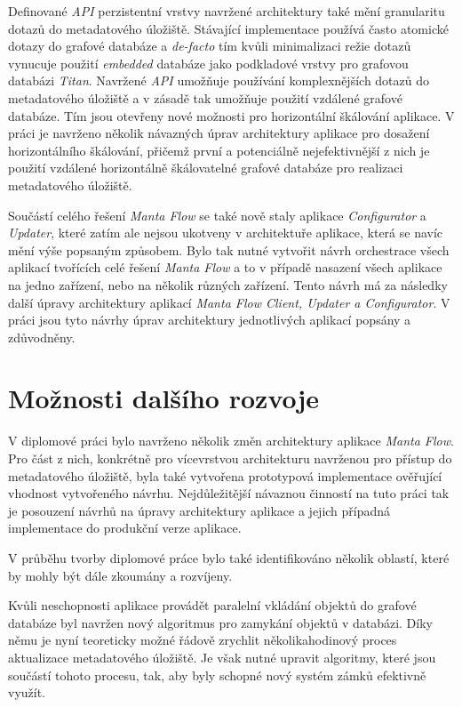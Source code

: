 Definované \textit{API} perzistentní vrstvy navržené architektury také mění granularitu dotazů do metadatového úložiště. Stávající implementace používá často atomické dotazy do grafové databáze a \textit{de-facto} tím kvůli minimalizaci režie dotazů vynucuje použití \textit{embedded} databáze jako podkladové vrstvy pro grafovou databázi \textit{Titan}. Navržené \textit{API} umožňuje používání komplexnějších dotazů do metadatového úložiště a v zásadě tak umožňuje použití vzdálené grafové databáze. Tím jsou otevřeny nové možnosti pro horizontální škálování aplikace. V práci je navrženo několik návazných úprav architektury aplikace pro dosažení horizontálního škálování, přičemž první a potenciálně nejefektivnější z nich je použití vzdálené horizontálně škálovatelné grafové databáze pro realizaci metadatového úložiště.

Součástí celého řešení \textit{Manta Flow} se také nově staly aplikace \textit{Configurator} a \textit{Updater}, které zatím ale nejsou ukotveny v architektuře aplikace, která se navíc mění výše popsaným způsobem. Bylo tak nutné vytvořit návrh orchestrace všech aplikací tvořících celé řešení \textit{Manta Flow} a to v případě nasazení všech aplikace na jedno zařízení, nebo na několik různých zařízení. Tento návrh má za následky další úpravy architektury aplikací \textit{Manta Flow Client, Updater a Configurator}. V práci jsou tyto návrhy úprav architektury jednotlivých aplikací popsány a zdůvodněny.

\section{Možnosti dalšího rozvoje}

V diplomové práci bylo navrženo několik změn architektury aplikace \textit{Manta Flow}. Pro část z nich, konkrétně pro vícevrstvou architekturu navrženou pro přístup do metadatového úložiště, byla také vytvořena prototypová implementace ověřující vhodnost vytvořeného návrhu. Nejdůležitější návaznou činností na tuto práci tak je posouzení návrhů na úpravy architektury aplikace a jejich případná implementace do produkční verze aplikace.

V průběhu tvorby diplomové práce bylo také identifikováno několik oblastí, které by mohly být dále zkoumány a rozvíjeny.

Kvůli neschopnosti aplikace provádět paralelní vkládání objektů do grafové databáze byl navržen nový algoritmus pro zamykání objektů v databázi. Díky němu je nyní teoreticky možné řádově zrychlit několikahodinový proces aktualizace metadatového úložiště. Je však nutné upravit algoritmy, které jsou součástí tohoto procesu, tak, aby byly schopné nový systém zámků efektivně využít.

